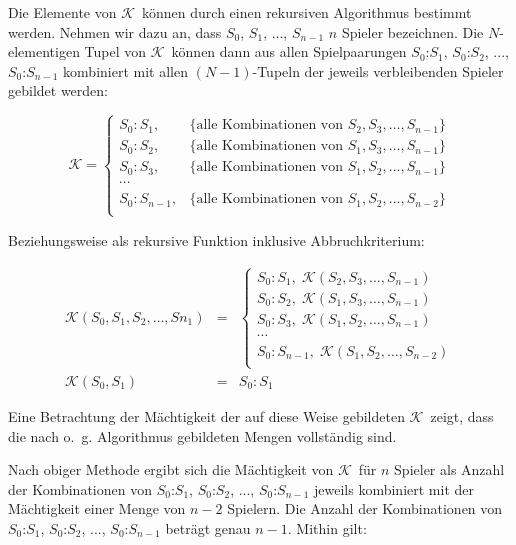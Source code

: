 \documentclass[DIV=15, 10pt]{scrartcl}
\newcommand{\KSet}{$\mathcal{K}$}
\begin{document}
Die Elemente von \KSet\ können durch einen rekursiven Algorithmus bestimmt werden. Nehmen wir dazu an, dass $S_0$, $S_1$, ..., $S_{n-1}$ $n$ Spieler bezeichnen. Die $N$-elementigen Tupel von \KSet\ können dann aus allen Spielpaarungen $S_0$:$S_1$, $S_0$:$S_2$, ..., $S_0$:$S_{n-1}$ kombiniert mit allen $(N-1)$-Tupeln der jeweils verbleibenden Spieler gebildet werden:

\[
\mathcal{K} = \left\lbrace
\begin{array}{ll}
S_0:S_1, & \{\text{alle Kombinationen von }S_2, S_3, \ldots, S_{n-1}\}\\
S_0:S_2, & \{\text{alle Kombinationen von }S_1, S_3, \ldots, S_{n-1}\}\\
S_0:S_3, & \{\text{alle Kombinationen von }S_1, S_2, \ldots, S_{n-1}\}\\
\cdots\\
S_0:S_{n-1}, & \{\text{alle Kombinationen von }S_1, S_2, \ldots, S_{n-2}\}\\
\end{array}
\right.
\]

Beziehungsweise als rekursive Funktion inklusive Abbruchkriterium:

\begin{equation}\label{AlgoK}
\begin{array}{rcl}
\mathcal{K}(S_0, S_1, S_2, \ldots, S{n_1}) & = & \left\lbrace
\begin{array}{ll}
S_0:S_1, \; \mathcal{K}(S_2, S_3, \ldots, S_{n-1})\\
S_0:S_2, \; \mathcal{K}(S_1, S_3, \ldots, S_{n-1})\\
S_0:S_3, \; \mathcal{K}(S_1, S_2, \ldots, S_{n-1})\\
\cdots\\
S_0:S_{n-1}, \; \mathcal{K}(S_1, S_2, \ldots, S_{n-2})\\
\end{array}\right.\\[12mm]
\mathcal{K}(S_0, S_1) & = & S_0 : S_1
\end{array}
\end{equation}

Eine Betrachtung der Mächtigkeit der auf diese Weise gebildeten \KSet\ zeigt, dass die nach o.~g. Algorithmus gebildeten Mengen vollständig sind.

Nach obiger Methode ergibt sich die Mächtigkeit von \KSet\ für $n$ Spieler als Anzahl der Kombinationen von $S_0$:$S_1$, $S_0$:$S_2$, ..., $S_0$:$S_{n-1}$ jeweils kombiniert mit der Mächtigkeit einer Menge von $n-2$ Spielern. Die Anzahl der Kombinationen von $S_0$:$S_1$, $S_0$:$S_2$, ..., $S_0$:$S_{n-1}$ beträgt genau $n-1$. Mithin gilt:
\end{document}
